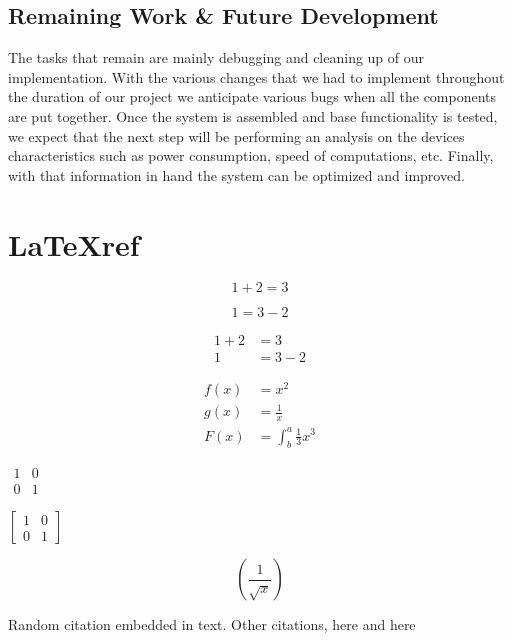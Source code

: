 \documentclass{article}
\begin{document}
\subsection{Remaining Work \& Future Development}
The tasks that remain are mainly debugging and cleaning up of our implementation. With the various changes that we had to implement throughout the duration of our project we anticipate various bugs when all the components are put together. Once the system is assembled and base functionality is tested, we expect that the next step will be performing an analysis on the devices characteristics such as power consumption, speed of computations, etc. Finally, with that information in hand the system can be optimized and improved.

\section{\LaTeX ref}

	\begin{equation*}
		1 + 2 = 3 
	\end{equation*}
	
	\begin{equation*}
		1 = 3 - 2
	\end{equation*}
	
	\begin{align*}
		1 + 2 &= 3\\
		1 &= 3 - 2
	\end{align*}

	\begin{align*}
		f(x) &= x^2\\
		g(x) &= \frac{1}{x}\\
		F(x) &= \int^a_b \frac{1}{3}x^3
	\end{align*}

	$\begin{matrix}
		1 & 0\\
		0 & 1
	\end{matrix}$

	$\left[
	\begin{matrix}
		1 & 0\\
		0 & 1
	\end{matrix}
	\right]$

	\begin{equation*}
		\left(\frac{1}{\sqrt{x}}\right)
	\end{equation*}

Random citation \cite{DUMMY:1} embedded in text.
Other citations, here \cite{deClercq:2015:ESI:2755753.2755830} and here \cite{Gottert:2012:DHB:2413316.2413355}

\newpage



	
\end{document}
